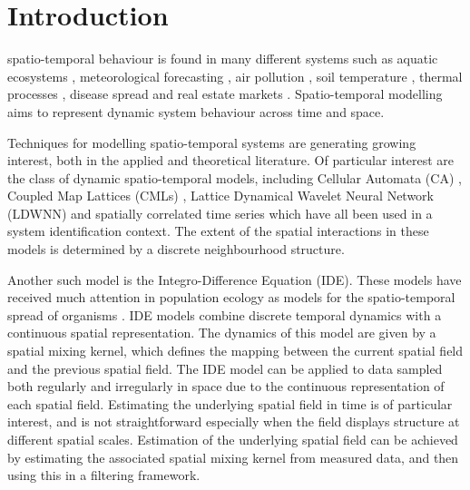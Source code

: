 \documentclass[11pt,draftcls,onecolumn,peerreview]{IEEEtran}
\begin{document}
\section{Introduction}
% 
% 
% 
% 
 spatio-temporal behaviour is found in many different systems such as aquatic ecosystems \cite{Schofield2002}, meteorological forecasting \cite{Xu2005}, air pollution \cite{Romanowicz2006}, soil temperature  \cite{Bond-Lamberty2005}, thermal processes \cite{Deng2005}, disease spread \cite{Kuo2009} and real estate markets \cite{Sun2005}. Spatio-temporal modelling aims to represent dynamic system behaviour across time and space. %

Techniques for modelling spatio-temporal systems are generating growing interest, both in the applied and theoretical literature. Of particular interest are the class of dynamic spatio-temporal models, including Cellular Automata (CA) \cite{Wolfram1984}, Coupled Map Lattices (CMLs) \cite{Billings2002}, Lattice Dynamical Wavelet Neural Network (LDWNN) \cite{Wei2009} and spatially correlated time series  \cite{Pfeifer1980,Glasbey2008,Dewar2007} which have all been used in a system identification context. The extent of the spatial interactions in these models is determined by a discrete neighbourhood structure.


Another such model is the Integro-Difference Equation (IDE). These models have received much attention in population ecology as models for the spatio-temporal spread of organisms \cite{Kot1992,Kot1996}. IDE models combine discrete temporal dynamics with a continuous spatial representation. The dynamics of this model are given by a spatial mixing kernel, which defines the mapping between the current spatial field and the previous spatial field. The IDE model can be applied to data sampled both regularly and irregularly in space due to the continuous representation of each spatial field. Estimating the underlying spatial field in time is of particular interest, and is not straightforward especially when the field displays structure at different spatial scales. Estimation of the underlying spatial field can be achieved by estimating the associated spatial mixing kernel from measured data, and then using this in a filtering framework. 
\end{document}
